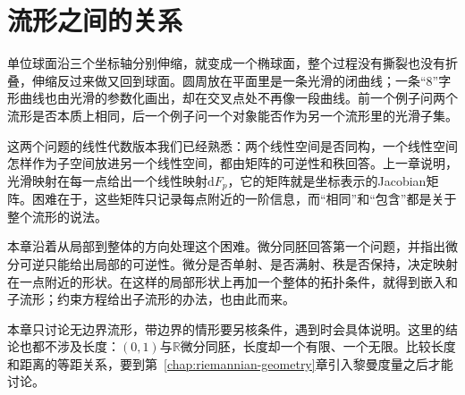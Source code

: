 \chapter{流形之间的关系}
\label{chap:manifold-relations}

单位球面沿三个坐标轴分别伸缩，就变成一个椭球面，整个过程没有撕裂也没有折叠，伸缩反过来做又回到球面。圆周放在平面里是一条光滑的闭曲线；一条“8”字形曲线也由光滑的参数化画出，却在交叉点处不再像一段曲线。前一个例子问两个流形是否本质上相同，后一个例子问一个对象能否作为另一个流形里的光滑子集。

这两个问题的线性代数版本我们已经熟悉：两个线性空间是否同构，一个线性空间怎样作为子空间放进另一个线性空间，都由矩阵的可逆性和秩回答。上一章说明，光滑映射在每一点给出一个线性映射$\mathrm dF_p$，它的矩阵就是坐标表示的Jacobian矩阵。困难在于，这些矩阵只记录每点附近的一阶信息，而“相同”和“包含”都是关于整个流形的说法。

本章沿着从局部到整体的方向处理这个困难。微分同胚回答第一个问题，并指出微分可逆只能给出局部的可逆性。微分是否单射、是否满射、秩是否保持，决定映射在一点附近的形状。在这样的局部形状上再加一个整体的拓扑条件，就得到嵌入和子流形；约束方程给出子流形的办法，也由此而来。

本章只讨论无边界流形，带边界的情形要另核条件，遇到时会具体说明。这里的结论也都不涉及长度：$(0,1)$与$\mathbb R$微分同胚，长度却一个有限、一个无限。比较长度和距离的等距关系，要到第~\ref{chap:riemannian-geometry}章引入黎曼度量之后才能讨论。





